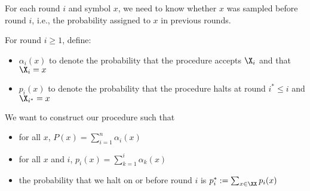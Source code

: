 \documentclass[class=co432,notes,tikz]{agony}
\begin{document}
For each round $i$ and symbol $x$,
we need to know whether $x$ was sampled before round $i$,
i.e., the probability assigned to $x$ in previous rounds.

For round $i \geq 1$, define:
\begin{itemize}[nosep]
  \item $\alpha_i(x)$ to denote the probability that the procedure accepts $\X_i$ and that $\X_i = x$
  \item $p_i(x)$ to denote the probability that the procedure halts at round $i^* \leq i$ and $\X_{i^*} = x$
\end{itemize}

We want to construct our procedure such that
\begin{itemize}[nosep]
  \item for all $x$, $P(x) = \sum_{i=1}^n \alpha_i(x)$
  \item for all $x$ and $i$, $p_i(x) = \sum_{k=1}^i \alpha_k(x)$
  \item the probability that we halt on or before round $i$ is $p_i^* := \sum_{x \in \XX} p_i(x)$
\end{itemize}





\end{document}
